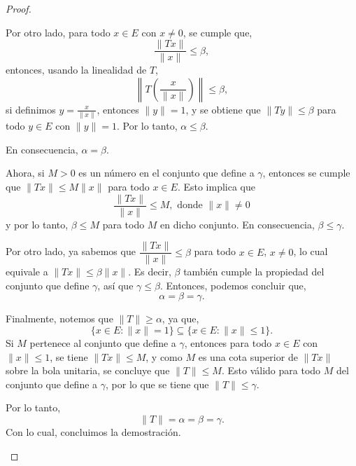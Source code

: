 \begin{proof}
\begin{enumerate}
Por otro lado, para todo \(x \in E\) con \(x \neq 0\), se cumple que,
\[
\frac{\|Tx\|}{\|x\|} \leq \beta,
\]
entonces, usando la linealidad de \(T\),
\[
\left\|T\left(\frac{x}{\|x\|}\right)\right\| \leq \beta,
\]
si definimos \(y = \frac{x}{\|x\|}\), entonces \(\|y\| = 1\), y se obtiene que \(\|Ty\| \leq \beta\) para todo \(y \in E\) con \(\|y\| = 1\). Por lo tanto, \(\alpha \leq \beta\).

En consecuencia, \(\alpha = \beta\).

Ahora, si \(M > 0\) es un número en el conjunto que define a \(\gamma\), entonces se cumple que \(\|Tx\| \leq M \|x\|\) para todo \(x \in E\). Esto implica que
\[
\frac{\|Tx\|}{\|x\|} \leq M, \text{ donde $\|x\| \neq 0$}
\]
y por lo tanto, \(\beta \leq M\) para todo \(M\) en dicho conjunto. En consecuencia, \(\beta \leq \gamma\).

Por otro lado, ya sabemos que \(\dfrac{\|Tx\|}{\|x\|} \leq \beta\) para todo \(x \in E\), \(x \neq 0\), lo cual equivale a \(\|Tx\| \leq \beta \|x\|\). Es decir, \(\beta\) también cumple la propiedad del conjunto que define \(\gamma\), así que \(\gamma \leq \beta\). Entonces, podemos concluir que,
\[
\alpha = \beta = \gamma.
\]

Finalmente, notemos que \(\|T\| \geq \alpha\), ya que,
\[
\{x \in E : \|x\| = 1\} \subseteq \{x \in E : \|x\| \leq 1\}.
\]
Si \(M\) pertenece al conjunto que define a \(\gamma\), entonces para todo \(x \in E\) con \(\|x\| \leq 1\), se tiene \(\|Tx\| \leq M\), y como \(M\) es una cota superior de \(\|Tx\|\) sobre la bola unitaria, se concluye que \(\|T\| \leq M\). Esto válido para todo \(M\) del conjunto que define a \(\gamma\), por lo que se tiene que \(\|T\| \leq \gamma\).

Por lo tanto,
\[
\|T\| = \alpha = \beta = \gamma.
\]
Con lo cual, concluimos la demostración.


\end{enumerate}
    
    
\end{proof}
